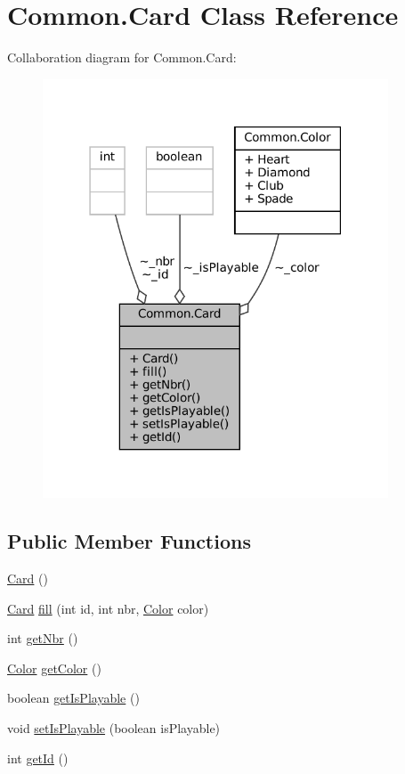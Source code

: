 \hypertarget{classCommon_1_1Card}{}\section{Common.\+Card Class Reference}
\label{classCommon_1_1Card}


Collaboration diagram for Common.\+Card\+:
\nopagebreak
\begin{figure}[H]
\begin{center}
\leavevmode
\includegraphics[width=291pt]{classCommon_1_1Card__coll__graph}
\end{center}
\end{figure}
\subsection*{Public Member Functions}
\begin{DoxyCompactItemize}
\item 
\mbox{\hyperlink{classCommon_1_1Card_aa34725a77b9b1303b5c67b9c2a9cf957}{Card}} ()
\item 
\mbox{\hyperlink{classCommon_1_1Card}{Card}} \mbox{\hyperlink{classCommon_1_1Card_a98fe165a8fb52b177efb8cf58961d876}{fill}} (int id, int nbr, \mbox{\hyperlink{enumCommon_1_1Color}{Color}} color)
\item 
int \mbox{\hyperlink{classCommon_1_1Card_a0d64a4a92a9e32d68465b77d646a4914}{get\+Nbr}} ()
\item 
\mbox{\hyperlink{enumCommon_1_1Color}{Color}} \mbox{\hyperlink{classCommon_1_1Card_a7527a91352a5c110c79a175f719b3abc}{get\+Color}} ()
\item 
boolean \mbox{\hyperlink{classCommon_1_1Card_a431524be99d59498172ca9d49b378623}{get\+Is\+Playable}} ()
\item 
void \mbox{\hyperlink{classCommon_1_1Card_a662df61afb520d172fb59c2c8d172386}{set\+Is\+Playable}} (boolean is\+Playable)
\item 
int \mbox{\hyperlink{classCommon_1_1Card_a4dcabbdd3a17d9c898cdd3832fd68c9e}{get\+Id}} ()
\end{DoxyCompactItemize}


